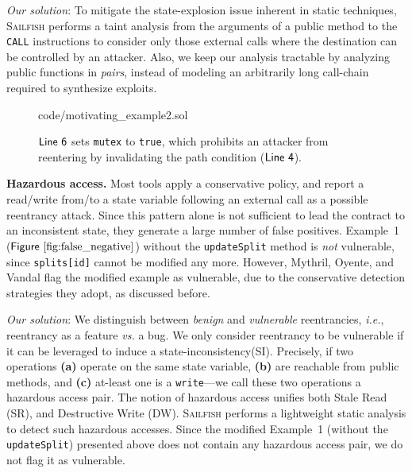 \documentclass[conference, romanappendices]{tex/IEEEtran}
\theoremstyle{bfnote}
\newcommand{\toolname}{\textsc{Sailfish}\xspace}
\newcommand{\oyente}{{\sc Oyente}\xspace}
\newcommand{\vandal}{{\sc Vandal}\xspace}
\newcommand{\reentrancy}{{reentrancy}\xspace}
\newcommand{\haz}{{hazardous access}\xspace}
\newcommand{\si}{{state-inconsistency}\xspace}
\newcommand{\mythril}{{\sc Mythril}\xspace}
\newcommand{\ie}{\textit{i.e.}}
\newcommand{\Line}[1]{\ensuremath{\sf Line~ #1}}
\newcommand{\Fig}[1]{\ensuremath{\sf Figure~\ref{#1}}}
\begin{document}
\textit{Our solution}: To mitigate the state-explosion issue inherent in static techniques, \toolname{} performs a taint analysis from the arguments of a public method to the \texttt{CALL} instructions to consider only those external calls where the destination can be controlled by an attacker.
Also, we keep our analysis tractable by analyzing public functions in \textit{pairs}, instead of modeling an arbitrarily long call-chain required to synthesize exploits.

\begin{figure}[t]
		{ \centering
			
			{code/motivating_example2.sol}
		}
	\vspace{-0.15in}
	\caption{\small \Line{6} sets \texttt{mutex} to \texttt{true}, which prohibits an attacker from reentering
	by invalidating the path condition (\Line{4}).}
	\label{fig:false_positive}
	\vspace{-6mm}
\end{figure}

\noindent
\textbf{Hazardous access.}
Most tools apply a conservative policy, and report a read/write from/to a state variable following an external call as a possible \reentrancy attack.
Since this pattern alone is not sufficient to lead the contract to an inconsistent state, they generate a large number of false positives.
Example~1 (\Fig{fig:false_negative}) without the \texttt{updateSplit} method is \textit{not} vulnerable, since \texttt{splits[id]} cannot be modified any more.
However, \mythril, \oyente{}, and \vandal{} flag the modified example as vulnerable, due to the conservative detection strategies they adopt, as discussed before.

\textit{Our solution}:
We distinguish between \textit{benign} and \textit{vulnerable} {reentrancies\EndAccSupp{}}, \ie, \reentrancy as a feature \textit{vs.} a bug.
We only consider \reentrancy to be vulnerable if it can be leveraged to induce a \si (SI).
Precisely, if two operations 
\textbf{(a)} operate on the same state variable,
\textbf{(b)} are reachable from public methods, and
\textbf{(c)} at-least one is a \texttt{write}---we call these two operations a \haz pair. 
The notion of \haz unifies both {Stale\EndAccSupp{}} Read (SR), and {Destructive\EndAccSupp{}} Write (DW).
\toolname performs a lightweight static analysis to detect such hazardous accesses.
Since the modified Example~1 (without the \texttt{updateSplit}) presented above does not contain any hazardous access pair, we do not flag it as vulnerable.
\end{document}
